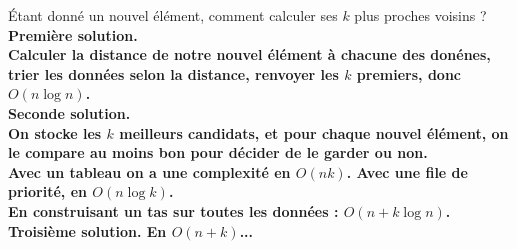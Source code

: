\documentclass[french, 11pt]{article}
\begin{document}
\vspace*{-0.4cm}

\begin{ex}{}{}
    Étant donné un nouvel élément, comment calculer ses $k$ plus proches voisins ?
    \tcblower
    \bf{Première solution.}\\
    Calculer la distance de notre nouvel élément à chacune des donénes, trier les données selon la distance, renvoyer les $k$ premiers, donc $O(n\log n)$.\\
    \bf{Seconde solution.}\\
    On stocke les $k$ meilleurs candidats, et pour chaque nouvel élément, on le compare au moins bon pour décider de le garder ou non.\\
    Avec un tableau on a une complexité en $O(nk)$. Avec une file de priorité, en $O(n\log k)$.\\
    En construisant un tas sur toutes les données : $O(n+k\log n)$.
    \bf{Troisième solution.} En $O(n+k)$...
\end{ex}
\end{document}
